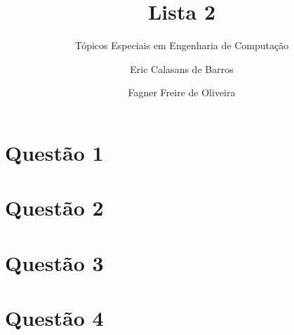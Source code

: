 \documentclass[fleqn]{beamer}\usepackage[]{graphicx}\usepackage[]{color}
\begin{document}
	\title{Lista 2}
	\subtitle{Tópicos Especiais em Engenharia de Computação}
	\author{Eric Calasans de Barros \and  Fagner Freire de Oliveira}
	
	\begin{frame}[plain]
		\maketitle
	\end{frame}
	\section{Questão 1}
	\section{Questão 2}
	\section{Questão 3}
	\section{Questão 4}
\end{document}
